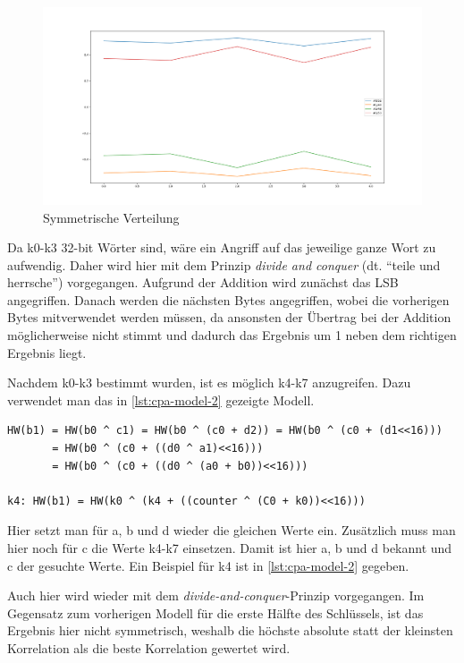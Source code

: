 \documentclass[a4paper,ngerman]{scrreprt}
\begin{document}
\begin{figure}[H]
    \caption{Symmetrische Verteilung}
    \label{fig:xor-symmetry}

    \includegraphics[width=\textwidth]{img/corrs_subkey_byte.png}
\end{figure}


Da k0-k3 32-bit Wörter sind, wäre ein Angriff auf das jeweilige ganze Wort zu
aufwendig. Daher wird hier mit dem Prinzip \emph{divide and conquer} (dt.
``teile und herrsche'') vorgegangen. Aufgrund der Addition wird zunächst das LSB
angegriffen. Danach werden die nächsten Bytes angegriffen, wobei die vorherigen
Bytes mitverwendet werden müssen, da ansonsten der Übertrag bei der Addition
möglicherweise nicht stimmt und dadurch das Ergebnis um 1 neben dem richtigen
Ergebnis liegt.

Nachdem k0-k3 bestimmt wurden, ist es möglich k4-k7 anzugreifen. Dazu verwendet
man das in \autoref{lst:cpa-model-2} gezeigte Modell.

\begin{lstlisting}[caption={Modell für Stromverbrauch von b1}, label=lst:cpa-model-2]
HW(b1) = HW(b0 ^ c1) = HW(b0 ^ (c0 + d2)) = HW(b0 ^ (c0 + (d1<<16)))
       = HW(b0 ^ (c0 + ((d0 ^ a1)<<16)))
       = HW(b0 ^ (c0 + ((d0 ^ (a0 + b0))<<16)))

k4: HW(b1) = HW(k0 ^ (k4 + ((counter ^ (C0 + k0))<<16)))
\end{lstlisting}

\medskip

Hier setzt man für a, b und d wieder die gleichen Werte ein. Zusätzlich muss man
hier noch für c die Werte k4-k7 einsetzen. Damit ist hier a, b und d bekannt und
c der gesuchte Werte. Ein Beispiel für k4 ist in \autoref{lst:cpa-model-2}
gegeben.

Auch hier wird wieder mit dem \emph{divide-and-conquer}-Prinzip vorgegangen. Im
Gegensatz zum vorherigen Modell für die erste Hälfte des Schlüssels, ist das
Ergebnis hier nicht symmetrisch, weshalb die höchste absolute statt der
kleinsten Korrelation als die beste Korrelation gewertet wird.
\end{document}

